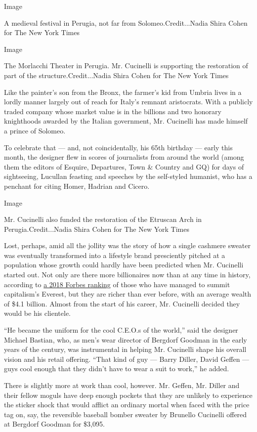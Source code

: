 Image

A medieval festival in Perugia, not far from Solomeo.Credit...Nadia
Shira Cohen for The New York Times

Image

The Morlacchi Theater in Perugia. Mr. Cucinelli is supporting the
restoration of part of the structure.Credit...Nadia Shira Cohen for The
New York Times

Like the painter's son from the Bronx, the farmer's kid from Umbria
lives in a lordly manner largely out of reach for Italy's remnant
aristocrats. With a publicly traded company whose market value is in the
billions and two honorary knighthoods awarded by the Italian government,
Mr. Cucinelli has made himself a prince of Solomeo.

To celebrate that --- and, not coincidentally, his 65th birthday ---
early this month, the designer flew in scores of journalists from around
the world (among them the editors of Esquire, Departures, Town \&
Country and GQ) for days of sightseeing, Lucullan feasting and speeches
by the self-styled humanist, who has a penchant for citing Homer,
Hadrian and Cicero.

Image

Mr. Cucinelli also funded the restoration of the Etruscan Arch in
Perugia.Credit...Nadia Shira Cohen for The New York Times

Lost, perhaps, amid all the jollity was the story of how a single
cashmere sweater was eventually transformed into a lifestyle brand
presciently pitched at a population whose growth could hardly have been
predicted when Mr. Cucinelli started out. Not only are there more
billionaires now than at any time in history, according to
\href{https://www.forbes.com/billionaires/\#424da2af251c}{a 2018 Forbes
ranking} of those who have managed to summit capitalism's Everest, but
they are richer than ever before, with an average wealth of \$4.1
billion. Almost from the start of his career, Mr. Cucinelli decided they
would be his clientele.

``He became the uniform for the cool C.E.O.s of the world,'' said the
designer Michael Bastian, who, as men's wear director of Bergdorf
Goodman in the early years of the century, was instrumental in helping
Mr. Cucinelli shape his overall vision and his retail offering. ``That
kind of guy --- Barry Diller, David Geffen --- guys cool enough that
they didn't have to wear a suit to work,'' he added.

There is slightly more at work than cool, however. Mr. Geffen, Mr.
Diller and their fellow moguls have deep enough pockets that they are
unlikely to experience the sticker shock that would afflict an ordinary
mortal when faced with the price tag on, say, the reversible baseball
bomber sweater by Brunello Cucinelli offered at Bergdorf Goodman for
\$3,095.

